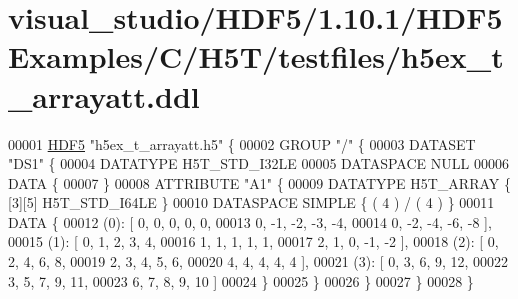 \hypertarget{visual__studio_2_h_d_f5_21_810_81_2_h_d_f5_examples_2_c_2_h5_t_2testfiles_2h5ex__t__arrayatt_8ddl_source}{}\section{visual\+\_\+studio/\+H\+D\+F5/1.10.1/\+H\+D\+F5\+Examples/\+C/\+H5\+T/testfiles/h5ex\+\_\+t\+\_\+arrayatt.ddl}
\label{visual__studio_2_h_d_f5_21_810_81_2_h_d_f5_examples_2_c_2_h5_t_2testfiles_2h5ex__t__arrayatt_8ddl_source}

\begin{DoxyCode}
00001 \hyperlink{namespace_h_d_f5}{HDF5} \textcolor{stringliteral}{"h5ex\_t\_arrayatt.h5"} \{
00002 GROUP \textcolor{stringliteral}{"/"} \{
00003    DATASET \textcolor{stringliteral}{"DS1"} \{
00004       DATATYPE  H5T\_STD\_I32LE
00005       DATASPACE  NULL
00006       DATA \{
00007       \}
00008       ATTRIBUTE \textcolor{stringliteral}{"A1"} \{
00009          DATATYPE  H5T\_ARRAY \{ [3][5] H5T\_STD\_I64LE \}
00010          DATASPACE  SIMPLE \{ ( 4 ) / ( 4 ) \}
00011          DATA \{
00012          (0): [ 0, 0, 0, 0, 0,
00013                0, -1, -2, -3, -4,
00014                0, -2, -4, -6, -8 ],
00015          (1): [ 0, 1, 2, 3, 4,
00016                1, 1, 1, 1, 1,
00017                2, 1, 0, -1, -2 ],
00018          (2): [ 0, 2, 4, 6, 8,
00019                2, 3, 4, 5, 6,
00020                4, 4, 4, 4, 4 ],
00021          (3): [ 0, 3, 6, 9, 12,
00022                3, 5, 7, 9, 11,
00023                6, 7, 8, 9, 10 ]
00024          \}
00025       \}
00026    \}
00027 \}
00028 \}
\end{DoxyCode}
